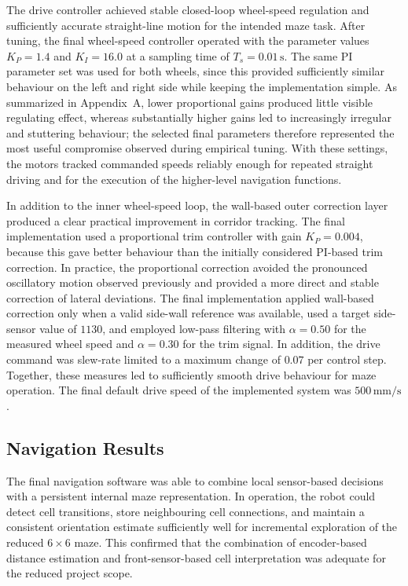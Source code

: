 The drive controller achieved stable closed-loop wheel-speed regulation and sufficiently accurate straight-line motion for the intended maze task. After tuning, the final wheel-speed controller operated with the parameter values $K_P = 1.4$ and $K_I = 16.0$ at a sampling time of $T_s = 0.01\,\mathrm{s}$. The same PI parameter set was used for both wheels, since this provided sufficiently similar behaviour on the left and right side while keeping the implementation simple. As summarized in Appendix~A, lower proportional gains produced little visible regulating effect, whereas substantially higher gains led to increasingly irregular and stuttering behaviour; the selected final parameters therefore represented the most useful compromise observed during empirical tuning. With these settings, the motors tracked commanded speeds reliably enough for repeated straight driving and for the execution of the higher-level navigation functions.

In addition to the inner wheel-speed loop, the wall-based outer correction layer produced a clear practical improvement in corridor tracking. The final implementation used a proportional trim controller with gain $K_P = 0.004$, because this gave better behaviour than the initially considered PI-based trim correction. In practice, the proportional correction avoided the pronounced oscillatory motion observed previously and provided a more direct and stable correction of lateral deviations. The final implementation applied wall-based correction only when a valid side-wall reference was available, used a target side-sensor value of $1130$, and employed low-pass filtering with $\alpha = 0.50$ for the measured wheel speed and $\alpha = 0.30$ for the trim signal. In addition, the drive command was slew-rate limited to a maximum change of $0.07$ per control step. Together, these measures led to sufficiently smooth drive behaviour for maze operation. The final default drive speed of the implemented system was $500\,\mathrm{mm/s}$.

\subsection{Navigation Results}

The final navigation software was able to combine local sensor-based decisions with a persistent internal maze representation. In operation, the robot could detect cell transitions, store neighbouring cell connections, and maintain a consistent orientation estimate sufficiently well for incremental exploration of the reduced $6 \times 6$ maze. This confirmed that the combination of encoder-based distance estimation and front-sensor-based cell interpretation was adequate for the reduced project scope.

